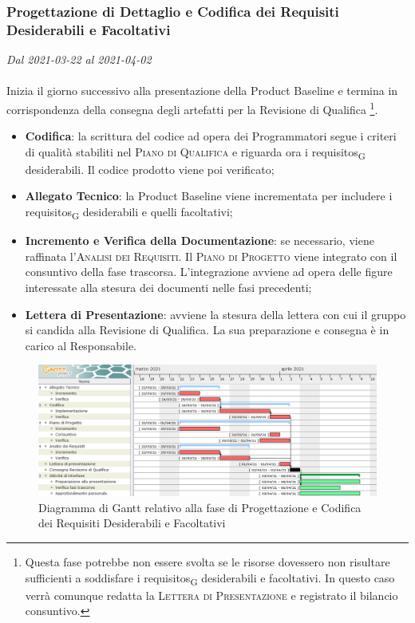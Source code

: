 \subsubsection{Progettazione di Dettaglio e Codifica dei Requisiti Desiderabili e Facoltativi}

\textit{Dal 2021-03-22 al 2021-04-02}
\\\\
Inizia il giorno successivo alla presentazione della Product Baseline e termina in corrispondenza della consegna degli artefatti per la Revisione di Qualifica \footnote{Questa fase potrebbe non essere svolta se le risorse dovessero non risultare sufficienti a soddisfare i \glspl{requisito}\textsubscript{G} desiderabili e facoltativi. In questo caso verrà comunque redatta la \textsc{Lettera di Presentazione} e registrato il bilancio consuntivo.}.
\begin{itemize}
	\item \textbf{Codifica}: la scrittura del codice ad opera dei Programmatori segue i criteri di qualità stabiliti nel \textsc{Piano di Qualifica} e riguarda ora i \glspl{requisito}\textsubscript{G} desiderabili. Il codice prodotto viene poi verificato;
	\item \textbf{Allegato Tecnico}: la Product Baseline viene incrementata per includere i \glspl{requisito}\textsubscript{G} desiderabili e quelli facoltativi;
	\item \textbf{Incremento e Verifica della Documentazione}: se necessario, viene raffinata l'\textsc{Analisi dei Requisiti}. Il \textsc{Piano di Progetto} viene integrato con il consuntivo della fase trascorsa. L'integrazione avviene ad opera delle figure interessate alla stesura dei documenti nelle fasi precedenti;
	\item \textbf{Lettera di Presentazione}: avviene la stesura della lettera con cui il gruppo si candida alla Revisione di Qualifica. La sua preparazione e consegna è in carico al Responsabile.
	
\end{itemize}


\begin{figure}[H]
	\centering
	\includegraphics[scale=0.48]{res/images/05_gantt_codifica_desiderabili.png}
	\caption{Diagramma di Gantt relativo alla fase di Progettazione e Codifica dei Requisiti Desiderabili e Facoltativi}
\end{figure}




